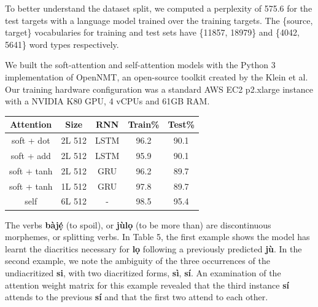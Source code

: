 \documentclass[a0,landscape]{a0poster}
\begin{document}
\begin{multicols}{4}
To better understand the dataset split, we computed a perplexity of 575.6 for the test targets with a language model trained over the training targets. The \{source, target\} vocabularies for training and test sets have \{11857, 18979\} and \{4042, 5641\} word types respectively.

We built the soft-attention and self-attention models with the Python 3 implementation of OpenNMT, an open-source toolkit created by the Klein et al. Our training hardware configuration was a standard AWS EC2 p2.xlarge instance with a NVIDIA K80 GPU, 4 vCPUs and 61GB RAM. 

\begin{center}
  \begin{tabular}{ccccc}
    \toprule
    \textbf{Attention} & \textbf{Size} & \textbf{RNN} & \textbf{Train\%} & \textbf{Test\%}\\
    \midrule
    soft + dot & 2L 512 & LSTM & 96.2 & 90.1  \\
    soft + add & 2L 512 & LSTM & 95.9 & 90.1  \\
	soft + tanh & 2L 512 & GRU & 96.2 & 89.7  \\ 
	soft + tanh & 1L 512 & GRU  & 97.8 & 89.7  \\ 
	\midrule
    self & 6L 512   & -  & 98.5 & 95.4 \\
    \bottomrule
  \end{tabular}
\end{center}

The verbs \textbf{b{\`a}j\d{\'e}} (to spoil), or \textbf{j{\`u}l\d{o}} (to be more than) are discontinuous morphemes, or splitting verbs. In Table 5, the first example shows the model has learnt the diacritics necessary for \textbf{l\d{o}} following a previously predicted \textbf{j{\`u}}. In the second example, we note the ambiguity of the three occurrences of the undiacritized \textbf{si}, with two diacritized forms, \textbf{s{\`i}}, \textbf{s{\'i}}. An examination of the attention weight matrix for this example revealed that the third instance \textbf{s{\'i}} attends to the previous \textbf{s{\'i}} and that the first two attend to each other.


\end{multicols}
\end{document}

